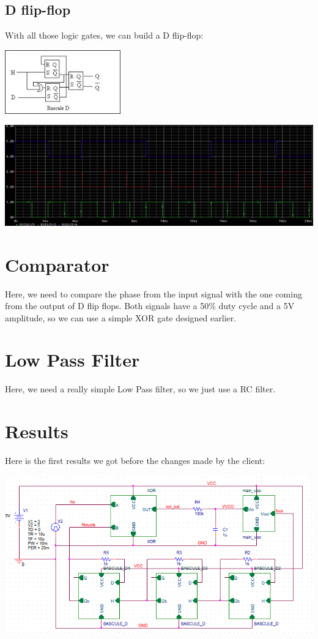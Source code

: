 \documentclass{article}
\begin{document}
\subsection{D flip-flop}

With all those logic gates, we can build a D flip-flop:

\includegraphics[width=5cm]{basculeD.png}

\includegraphics[width=15cm]{test_bascule_D.png}

\section{Comparator}

Here, we need to compare the phase from the input signal with the one coming from the output of D flip flops. Both signals have a 50\% duty cycle and a 5V amplitude, so we can use a simple XOR gate designed earlier.

\section{Low Pass Filter}

Here, we need a really simple Low Pass filter, so we just use a RC filter.

\section{Results}

Here is the first results we got before the changes made by the client:

\includegraphics[width=15cm]{pll_first_schematic.png}
\end{document}
